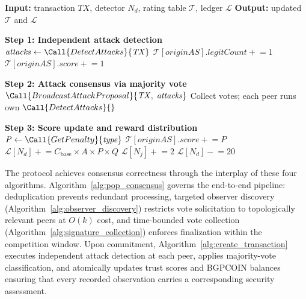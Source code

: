\begin{algorithm}[t]
\caption{Attack Classification and Incentive Distribution}
\label{alg:create_transaction}
\begin{algorithmic}[1]
\Statex \textbf{Input:} transaction $\mathit{TX}$, detector $\mathit{N_d}$, rating table $\mathcal{T}$, ledger $\mathcal{L}$
\Statex \textbf{Output:} updated $\mathcal{T}$ and $\mathcal{L}$

\Statex \textbf{Step 1: Independent attack detection}
\State $\mathit{attacks} \gets \Call{DetectAttacks}{\mathit{TX}}$ 
    \State $\mathcal{T}[\mathit{originAS}].\mathit{legitCount} \mathrel{+}= 1$
        \State $\mathcal{T}[\mathit{originAS}].\mathit{score} \mathrel{+}= 1$ 
    \EndIf
    \State \Return
\EndIf

\Statex \textbf{Step 2: Attack consensus via majority vote}
\State $\Call{BroadcastAttackProposal}{\mathit{TX},\; \mathit{attacks}}$
\State Collect votes; each peer runs own $\Call{DetectAttacks}{}$

\Statex \textbf{Step 3: Score update and reward distribution}
 
    \State $\mathit{P} \gets \Call{GetPenalty}{\mathit{type}}$ 
    \State $\mathcal{T}[\mathit{originAS}].\mathit{score} \mathrel{+}= \mathit{P}$
    \State $\mathcal{L}[\mathit{N_d}] \mathrel{+}= \mathit{C_{\mathrm{base}}} \times \mathit{A} \times \mathit{P} \times \mathit{Q}$ 
        \State $\mathcal{L}[\mathit{N_j}] \mathrel{+}= 2$ 
    \EndFor
{} 
    \State $\mathcal{L}[\mathit{N_d}] \mathrel{-}= 20$ 
\EndIf
\end{algorithmic}
\end{algorithm}

The protocol achieves consensus correctness through the interplay of these four algorithms. Algorithm~\ref{alg:pop_consensus} governs the end-to-end pipeline: deduplication
  prevents redundant processing, targeted observer discovery (Algorithm~\ref{alg:observer_discovery}) restricts vote solicitation to topologically relevant peers at $O(k)$ cost,
  and time-bounded vote collection (Algorithm~\ref{alg:signature_collection}) enforces finalization within the competition window. Upon commitment,
  Algorithm~\ref{alg:create_transaction} executes independent attack detection at each peer, applies majority-vote classification, and atomically updates trust scores and BGPCOIN balances ensuring that every recorded observation carries a corresponding security assessment.

